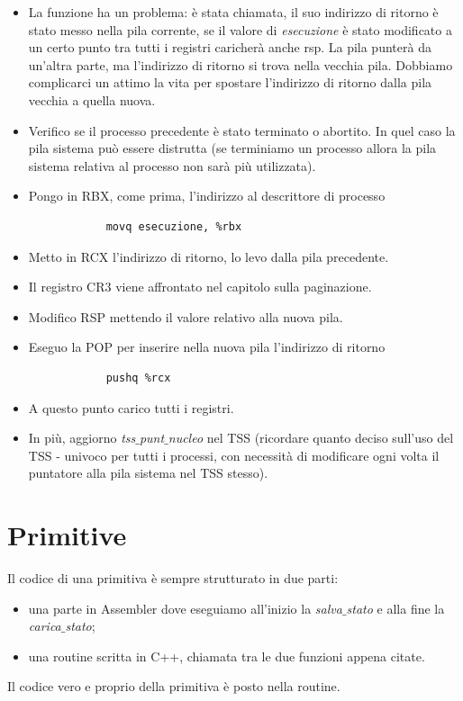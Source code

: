 \documentclass[11pt]{report}
\theoremstyle{definition}
\begin{document}
	\begin{itemize}
		\item La funzione ha un problema: è stata chiamata, il suo indirizzo di ritorno è stato messo nella pila corrente, se il valore di \emph{esecuzione} è stato modificato a un certo punto tra tutti i registri caricherà anche rsp. La pila punterà da un'altra parte, ma l'indirizzo di ritorno si trova nella vecchia pila. Dobbiamo complicarci un attimo la vita per spostare l'indirizzo di ritorno dalla pila vecchia a quella nuova.
		\item Verifico se il processo precedente è stato terminato o abortito. In quel caso la pila sistema può essere distrutta (se terminiamo un processo allora la pila sistema relativa al processo non sarà più utilizzata).
		\item Pongo in RBX, come prima, l'indirizzo al descrittore di processo
		\begin{verbatim}
			movq esecuzione, %rbx
		\end{verbatim}
		\item Metto in RCX l'indirizzo di ritorno, lo levo dalla pila precedente.
		\item Il registro CR3 viene affrontato nel capitolo sulla paginazione.
		\item Modifico RSP mettendo il valore relativo alla nuova pila.
		\item Eseguo la POP per inserire nella nuova pila l'indirizzo di ritorno
		\begin{verbatim}
			pushq %rcx
		\end{verbatim}
		\item A questo punto carico tutti i registri. 
		\item In più, aggiorno \emph{tss$\_$punt$\_$nucleo}  nel TSS (ricordare quanto deciso sull'uso del TSS - univoco per tutti i processi, con necessità di modificare ogni volta il puntatore alla pila sistema nel TSS stesso).
	\end{itemize}




\section{Primitive}
Il codice di una primitiva è sempre strutturato in due parti:
\begin{itemize}
	\item una parte in Assembler dove eseguiamo all'inizio la \emph{salva$\_$stato} e alla fine la \emph{carica$\_$stato};
	\item una routine scritta in C++, chiamata tra le due funzioni appena citate.
\end{itemize}
Il codice vero e proprio della primitiva è posto nella routine.
\end{document}
